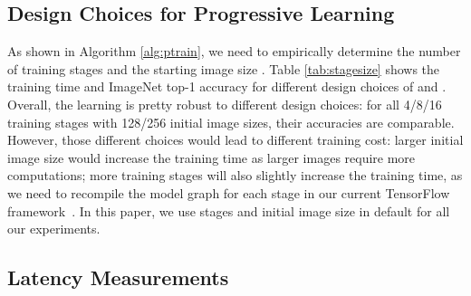 \documentclass{article}
\begin{document}
\subsection{Design Choices for Progressive Learning}

As shown in Algorithm \ref{alg:ptrain}, we need to empirically determine the number of training stages  and the starting image size . Table \ref{tab:stagesize} shows the training time and ImageNet top-1 accuracy for different design choices of  and . Overall, the learning is pretty robust to different design choices: for all 4/8/16 training stages with 128/256 initial image sizes, their accuracies are comparable. However, those different choices would lead to different training cost: larger initial image size would increase the training time as larger images require more computations; more training stages will also slightly increase the training time, as we need to recompile the model graph for each stage in our current TensorFlow framework~\cite{tensorflow}. In this paper, we use stages  and initial image size  in default for all our experiments.

\begin{table}[!h]
  \vskip -0.15in
    \caption{
        Training stage and initial image size choices -- Large initial image sizes or more training stages would increase the training time but doesn't improve accuracy. Overall, our improved method of progressive learning is robust to different choices.
       }
    \centering
    \label{tab:stagesize}
  \vskip -0.1in
\end{table} 
\subsection{Latency Measurements}
\end{document}
